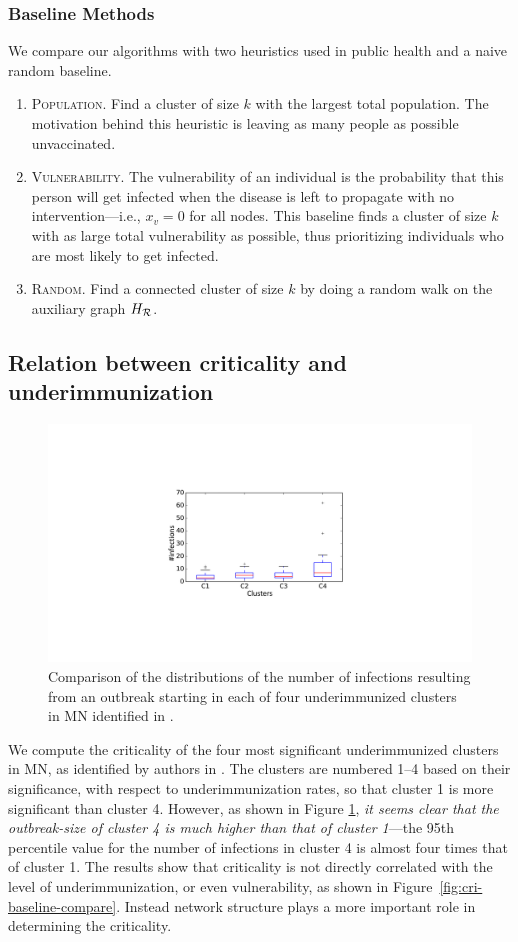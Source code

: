 \subsubsection{Baseline Methods}
We compare our algorithms with two heuristics used in public health and a naive random baseline.
\begin{enumerate}
\item \textsc{Population.} Find a cluster of size $k$ with the largest total population.
The motivation behind this heuristic is leaving as many people as possible unvaccinated.

\item \textsc{Vulnerability.} The vulnerability of an individual is the probability that this person will get infected when the disease is left to propagate with no intervention---i.e., $x_v = 0$ for all nodes. This baseline finds a cluster of size $k$ with as large total vulnerability as possible, thus prioritizing individuals who are most likely to get infected. 
\item \textsc{Random.} Find a connected cluster of size $k$ by doing a random walk on the auxiliary graph $H_{\mathcal{R}}$.
\end{enumerate}

\subsection{Relation between criticality and underimmunization}
\begin{figure}
\centering
\includegraphics[width=.35\textwidth]{img/criticality-schools-mn.pdf}
\vspace{-.2in}
\caption{Comparison of the distributions of the number of infections resulting from an
outbreak starting in each of  four underimmunized clusters in MN identified in \cite{cadena:vacc-cluster}.}
\label{fig:criticality-compare}
\end{figure}

We compute the criticality of the four most significant underimmunized clusters in MN, as identified by authors in \cite{cadena:vacc-cluster}.
The clusters are numbered 1--4 based on their significance, with respect to
underimmunization rates, so that cluster 1 is more significant than cluster 4.
However, as shown in Figure \ref{fig:criticality-compare},
\emph{it seems clear that the outbreak-size of cluster 4 is much higher than
that of cluster 1}---the 95th percentile value for the number of infections in
cluster 4 is almost four times that of cluster 1. The results show that criticality is not directly 
correlated with the level of underimmunization, or even vulnerability, as shown in Figure~\ref{fig:cri-baseline-compare}. Instead network structure plays a more important role in determining 
the criticality. 

